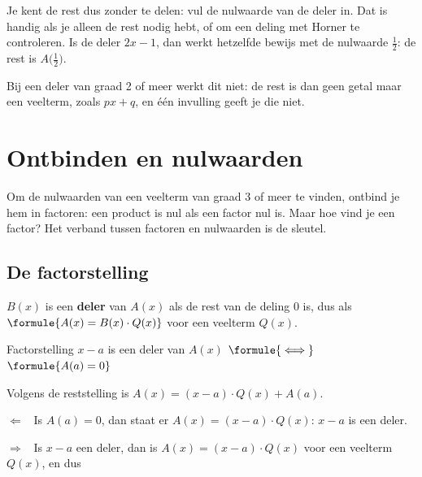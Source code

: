Je kent de rest dus zonder te delen: vul de nulwaarde van de deler in. Dat is handig als je alleen de rest nodig hebt, of om een deling met Horner te controleren. Is de deler $2x - 1$, dan werkt hetzelfde bewijs met de nulwaarde $\frac12$: de rest is $A\bigl(\frac12\bigr)$.


Bij een deler van graad 2 of meer werkt dit niet: de rest is dan geen getal maar een veelterm, zoals $px + q$, en één invulling geeft je die niet.

\begin{oefeningen}

\end{oefeningen}

\section{Ontbinden en nulwaarden}

Om de nulwaarden van een veelterm van graad 3 of meer te vinden, ontbind je hem in factoren: een product is nul als een factor nul is. Maar hoe vind je een factor? Het verband tussen factoren en nulwaarden is de sleutel.

\subsection{De factorstelling}

\begin{theorie}
$B(x)$ is een \textbf{\textcolor{accent}{deler}} van $A(x)$ als de rest van de deling $0$ is, dus als $\formule{A(x) = B(x) \cdot Q(x)}$ voor een veelterm $Q(x)$.

\begin{stelling}{Factorstelling}
$x - a$ is een deler van $A(x)$ \quad $\formule{\iff}$ \quad $\formule{A(a) = 0}$
\end{stelling}

\begin{bewijs}
Volgens de reststelling is $A(x) = (x - a) \cdot Q(x) + A(a)$.

$\Leftarrow$ \ Is $A(a) = 0$, dan staat er $A(x) = (x - a) \cdot Q(x)$: $x - a$ is een deler.

$\Rightarrow$ \ Is $x - a$ een deler, dan is $A(x) = (x - a) \cdot Q(x)$ voor een veelterm $Q(x)$, en dus
\end{bewijs}
\end{theorie}

